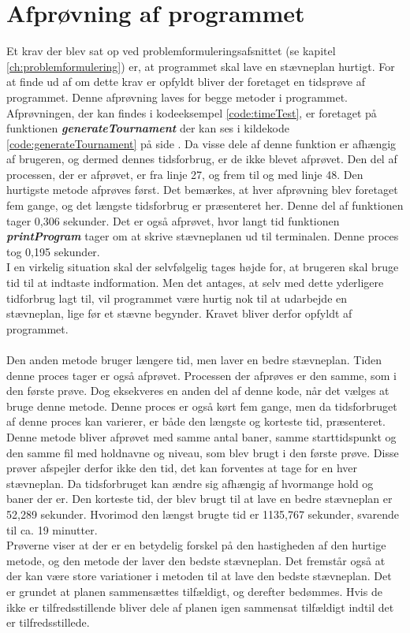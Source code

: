 \section{Afprøvning af programmet}\label{afsnit:test}
Et krav der blev sat op ved problemformuleringsafsnittet (se kapitel \ref{ch:problemformulering}) er, at programmet skal lave en stævneplan hurtigt. For at finde ud af om dette krav er opfyldt bliver der foretaget en tidsprøve af programmet. Denne afprøvning laves for begge metoder i programmet.
\\
Afprøvningen, der kan findes i kodeeksempel \ref{code:timeTest}, er foretaget på funktionen \textbf{\textit{generateTournament}} der kan ses i kildekode \ref{code:generateTournament} på side \pageref{code:generateTournament}. Da visse dele af denne funktion er afhængig af brugeren, og dermed dennes tidsforbrug, er de ikke blevet afprøvet. Den del af processen, der er afprøvet, er fra linje 27, og frem til og med linje 48. Den hurtigste metode afprøves først.
Det bemærkes, at hver afprøvning blev foretaget fem gange, og det længste tidsforbrug er præsenteret her. Denne del af funktionen tager 0,306 sekunder. Det er også afprøvet, hvor langt tid funktionen \textbf{\textit{printProgram}} tager om at skrive stævneplanen ud til terminalen. Denne proces tog 0,195 sekunder.
\\
I en virkelig situation skal der selvfølgelig tages højde for, at brugeren skal bruge tid til at indtaste indformation. Men det antages, at selv med dette yderligere tidforbrug lagt til, vil programmet være hurtig nok til at udarbejde en stævneplan, lige før et stævne begynder. Kravet bliver derfor opfyldt af programmet.
\\\\
Den anden metode bruger længere tid, men laver en bedre stævneplan. Tiden denne proces tager er også afprøvet. Processen der afprøves er den samme, som i den første prøve. Dog eksekveres en anden del af denne kode, når det vælges at bruge denne metode.  
Denne proces er også kørt fem gange, men da tidsforbruget af denne proces kan varierer, er både den længste og korteste tid, præsenteret. Denne metode bliver afprøvet med samme antal baner, samme starttidspunkt og den samme fil med holdnavne og niveau, som blev brugt i den første prøve. Disse prøver afspejler derfor ikke den tid, det kan forventes at tage for en hver stævneplan. Da tidsforbruget kan ændre sig afhængig af hvormange hold og baner der er.
Den korteste tid, der blev brugt til at lave en bedre stævneplan er 52,289 sekunder. Hvorimod den længst brugte tid er 1135,767 sekunder, svarende til ca. 19 minutter. 
\\
Prøverne viser at der er en betydelig forskel på den hastigheden af den hurtige metode, og den metode der laver den bedste stævneplan. Det fremstår også at der kan være store variationer i metoden til at lave den bedste stævneplan. Det er grundet at planen sammensættes tilfældigt, og derefter bedømmes. Hvis de ikke er tilfredsstillende bliver dele af planen igen sammensat tilfældigt indtil det er tilfredsstillede. 
\\

